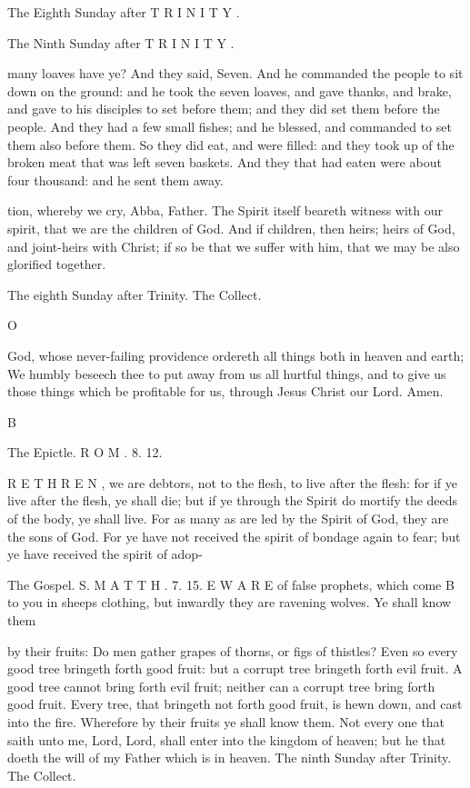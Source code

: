 The Eighth Sunday after T R I N I T Y .

The Ninth Sunday after T R I N I T Y .

many loaves have ye? And they said, Seven. And he commanded the people to sit down on the ground: and he took the seven loaves, and gave thanks, and brake, and gave to his disciples to set before them; and they did set them before the people. And they had a few small fishes; and he blessed, and commanded to set them also before them. So they did eat, and were filled: and they took up of the broken meat that was left seven baskets. And they that had eaten were about four thousand: and he sent them away.

tion, whereby we cry, Abba, Father. The Spirit itself beareth witness with our spirit, that we are the children of God. And if children, then heirs; heirs of God, and joint-heirs with Christ; if so be that we suffer with him, that we may be also glorified together.

The eighth Sunday after Trinity. The Collect.

O

God, whose never-failing providence ordereth all things both in heaven and earth; We humbly beseech thee to put away from us all hurtful things, and to give us those things which be profitable for us, through Jesus Christ our Lord. Amen.

B

The Epictle. R O M . 8. 12.

R E T H R E N , we are debtors, not to the flesh, to live after the flesh: for if ye live after the flesh, ye shall die; but if ye through the Spirit do mortify the deeds of the body, ye shall live. For as many as are led by the Spirit of God, they are the sons of God. For ye have not received the spirit of bondage again to fear; but ye have received the spirit of adop-

The Gospel. S. M A T T H . 7. 15. E W A R E of false prophets, which come B to you in sheeps clothing, but inwardly they are ravening wolves. Ye shall know them

by their fruits: Do men gather grapes of thorns, or figs of thistles? Even so every good tree bringeth forth good fruit: but a corrupt tree bringeth forth evil fruit. A good tree cannot bring forth evil fruit; neither can a corrupt tree bring forth good fruit. Every tree, that bringeth not forth good fruit, is hewn down, and cast into the fire. Wherefore by their fruits ye shall know them. Not every one that saith unto me, Lord, Lord, shall enter into the kingdom of heaven; but he that doeth the will of my Father which is in heaven. The ninth Sunday after Trinity. The Collect.

